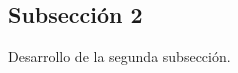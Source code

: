 \documentclass[a4paper,12pt]{article} %
\begin{document}

\subsection{Subsección 2}
Desarrollo de la segunda subsección.
\end{document}
